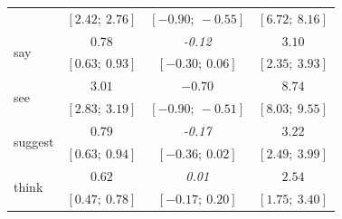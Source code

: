 \documentclass[11pt,fleqn]{article}
\newcommand{\6}{\mbox{$[\hspace*{-.6mm}[$}}
\newcommand{\9}{\mbox{$]\hspace*{-.6mm}]$}}
\begin{document}
\begin{table}
\begin{center}
\begin{tabular}{l c c c}
& $[2.42;\ 2.76]$  & $[-0.90;\ -0.55]$ & $[6.72;\ 8.16]$   \\
[.25em]
\multirow{2}{*}{say} & $0.78 $ & \emph{-0.12}  & $3.10 $        \\
& $[0.63;\ 0.93]$  & $[-0.30;\ 0.06]$ & $[2.35;\ 3.93]$   \\
[.25em]
\multirow{2}{*}{see} & $3.01 $ & $-0.70 $  & $8.74 $        \\
& $[2.83;\ 3.19]$  & $[-0.90;\ -0.51]$ & $[8.03;\ 9.55]$   \\
[.25em]
\multirow{2}{*}{suggest} & $0.79 $ & \emph{-0.17}  & $3.22 $        \\
& $[0.63;\ 0.94]$  & $[-0.36;\ 0.02]$ & $[2.49;\ 3.99]$   \\
[.25em]
\multirow{2}{*}{think} & $0.62 $ & \emph{0.01} & $2.54 $        \\
& $[0.47;\ 0.78]$  & $[-0.17;\ 0.20]$ & $[1.75;\ 3.40]$   \\
\bottomrule
\end{tabular}
\label{tab:exp1modelresults}
\end{center}
\end{table}

\normalsize
\end{document}
